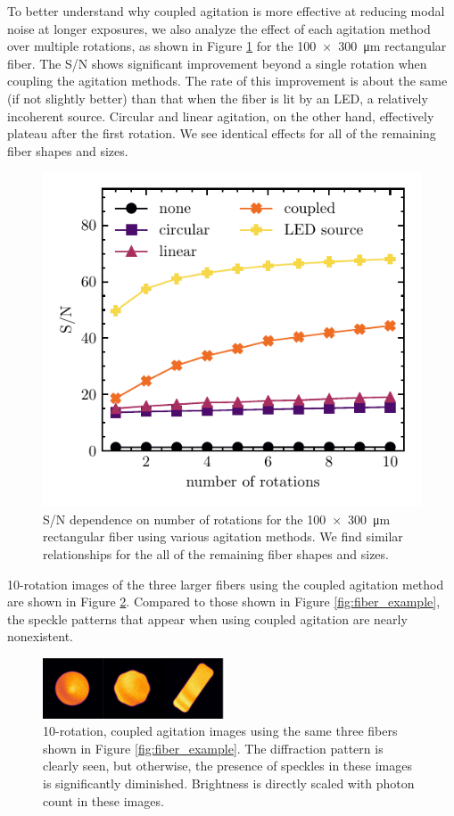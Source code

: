 \documentclass[11pt]{article}
\begin{document}
To better understand why coupled agitation is more effective at reducing modal noise at longer exposures, we also analyze the effect of each agitation method over multiple rotations, as shown in Figure \ref{fig:rect_snr_vs_time} for the \SI{100x300}{\micro\meter} rectangular fiber. The S/N shows significant improvement beyond a single rotation when coupling the agitation methods. The rate of this improvement is about the same (if not slightly better) than that when the fiber is lit by an LED, a relatively incoherent source. Circular and linear agitation, on the other hand, effectively plateau after the first rotation. We see identical effects for all of the remaining fiber shapes and sizes.

\begin{figure}
\centering
	\includegraphics[width=0.5\columnwidth]{images/rect_snr_vs_time.pdf}
	\caption{S/N dependence on number of rotations for the \SI{100x300}{\micro\meter} rectangular fiber using various agitation methods. We find similar relationships for the all of the remaining fiber shapes and sizes.}
\label{fig:rect_snr_vs_time}
\end{figure}

10-rotation images of the three larger fibers using the coupled agitation method are shown in Figure \ref{fig:fiber_improved}. Compared to those shown in Figure \ref{fig:fiber_example}, the speckle patterns that appear when using coupled agitation are nearly nonexistent.

\begin{figure}
    \begin{center}
    	\includegraphics[width=0.48\textwidth]{images/fiber_improved.pdf}
    \end{center}
	\caption{10-rotation, coupled agitation images using the same three fibers shown in Figure \ref{fig:fiber_example}.  The diffraction pattern is clearly seen, but otherwise, the presence of speckles in these images is significantly diminished. Brightness is directly scaled with photon count in these images.}
\label{fig:fiber_improved}
\end{figure}
\end{document}
